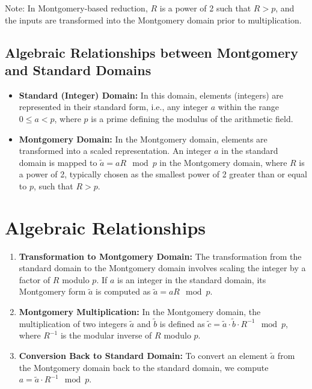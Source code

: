 Note: In Montgomery-based reduction, $R$ is a power of 2 such that $R > p$, and the inputs are transformed into the Montgomery domain prior to multiplication.

\subsection{Algebraic Relationships between Montgomery and Standard Domains}

\begin{itemize}
\item \textbf{Standard (Integer) Domain:} In this domain, elements (integers) are represented in their standard form, i.e., any integer $a$ within the range $0 \leq a < p$, where $p$ is a prime defining the modulus of the arithmetic field.
\item \textbf{Montgomery Domain:} In the Montgomery domain, elements are transformed into a scaled representation. An integer $a$ in the standard domain is mapped to $\widetilde{a} = aR \mod p$ in the Montgomery domain, where $R$ is a power of 2, typically chosen as the smallest power of 2 greater than or equal to $p$, such that $R > p$.
\end{itemize}

\section*{Algebraic Relationships}

\begin{enumerate}
	\item \textbf{Transformation to Montgomery Domain:} The transformation from the standard domain to the Montgomery domain involves scaling the integer by a factor of $R$ modulo $p$. If $a$ is an integer in the standard domain, its Montgomery form $\widetilde{a}$ is computed as $\widetilde{a} = aR \mod p$.
	\item \textbf{Montgomery Multiplication:} In the Montgomery domain, the multiplication of two integers $\widetilde{a}$ and $\widetilde{b}$ is defined as $\widetilde{c} = \widetilde{a} \cdot \widetilde{b} \cdot R^{-1} \mod p$, where $R^{-1}$ is the modular inverse of $R$ modulo $p$.
	\item \textbf{Conversion Back to Standard Domain:} To convert an element $\widetilde{a}$ from the Montgomery domain back to the standard domain, we compute $a = \widetilde{a} \cdot R^{-1} \mod p$.
\end{enumerate}

